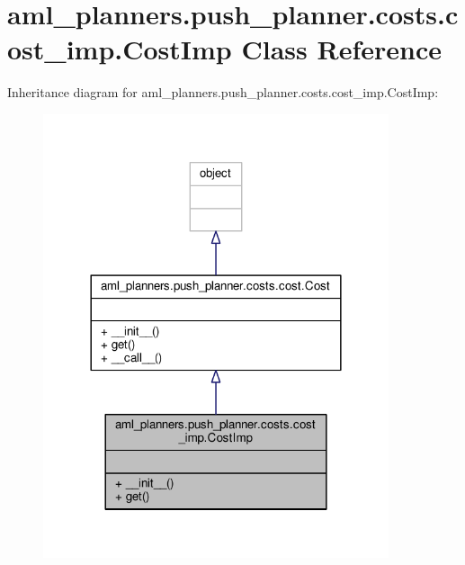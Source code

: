\hypertarget{classaml__planners_1_1push__planner_1_1costs_1_1cost__imp_1_1_cost_imp}{\section{aml\-\_\-planners.\-push\-\_\-planner.\-costs.\-cost\-\_\-imp.\-Cost\-Imp Class Reference}
\label{classaml__planners_1_1push__planner_1_1costs_1_1cost__imp_1_1_cost_imp}
}


Inheritance diagram for aml\-\_\-planners.\-push\-\_\-planner.\-costs.\-cost\-\_\-imp.\-Cost\-Imp\-:\nopagebreak
\begin{figure}[H]
\begin{center}
\leavevmode
\includegraphics[width=288pt]{classaml__planners_1_1push__planner_1_1costs_1_1cost__imp_1_1_cost_imp__inherit__graph}
\end{center}
\end{figure}


